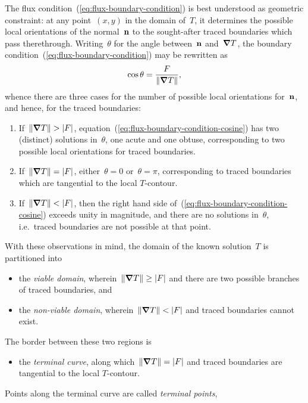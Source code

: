 The flux condition~(\ref{eq:flux-boundary-condition})
is best understood as geometric constraint:
at any point~$(x, y)$ in the domain of~$T$,
it determines the possible local orientations
of the normal~$\mathop{}\!\boldsymbol{\mathrm{n}}$ to the sought-after traced boundaries
which pass therethrough.
Writing~$\theta$ for the angle between~$\mathop{}\!\boldsymbol{\mathrm{n}}$ and~$\mathop{}\!\boldsymbol{\mathrm{\nabla}} T$,
the boundary condition~(\ref{eq:flux-boundary-condition}) may be rewritten as
\begin{equation}
  \cos\theta = \frac{F}{\lVert\mathop{}\!\boldsymbol{\mathrm{\nabla}} T\rVert},
  \label{eq:flux-boundary-condition-cosine}
\end{equation}
whence there are three cases
for the number of possible local orientations for~$\mathop{}\!\boldsymbol{\mathrm{n}}$,
and hence, for the traced boundaries:
\begin{enumerate}
  \item
    If~$\lVert\mathop{}\!\boldsymbol{\mathrm{\nabla}} T\rVert > \lvert F\rvert$,
    equation~(\ref{eq:flux-boundary-condition-cosine})
    has two (distinct) solutions in~$\theta$,
    one acute and one obtuse,
    corresponding to two possible local orientations for traced boundaries.
  \item
    If~$\lVert\mathop{}\!\boldsymbol{\mathrm{\nabla}} T\rVert = \lvert F\rvert$,
    either~$\theta = 0$ or~$\theta = \pi$,
    corresponding to traced boundaries which are tangential
    to the local $T$-contour.
  \item
    If~$\lVert\mathop{}\!\boldsymbol{\mathrm{\nabla}} T\rVert < \lvert F\rvert$,
    then the right hand side of~(\ref{eq:flux-boundary-condition-cosine})
    exceeds unity in magnitude,
    and there are no solutions in~$\theta$,
    i.e.~traced boundaries are not possible at that point.
\end{enumerate}
With these observations in mind,
the domain of the known solution~$T$
is partitioned into
\begin{itemize}
  \item
    the \emph{viable domain},
    wherein~$\lVert\mathop{}\!\boldsymbol{\mathrm{\nabla}} T\rVert \ge \lvert F\rvert$
    and there are two possible branches of traced boundaries,
    and
  \item
    the \emph{non-viable domain},
    wherein~$\lVert\mathop{}\!\boldsymbol{\mathrm{\nabla}} T\rVert < \lvert F\rvert$
    and traced boundaries cannot exist.
\end{itemize}
The border between these two regions is
\begin{itemize}
  \item
    the \emph{terminal curve},
    along which~$\lVert\mathop{}\!\boldsymbol{\mathrm{\nabla}} T\rVert = \lvert F\rvert$
    and traced boundaries are tangential to the local $T$-contour.
\end{itemize}
Points along the terminal curve are called \emph{terminal points},
